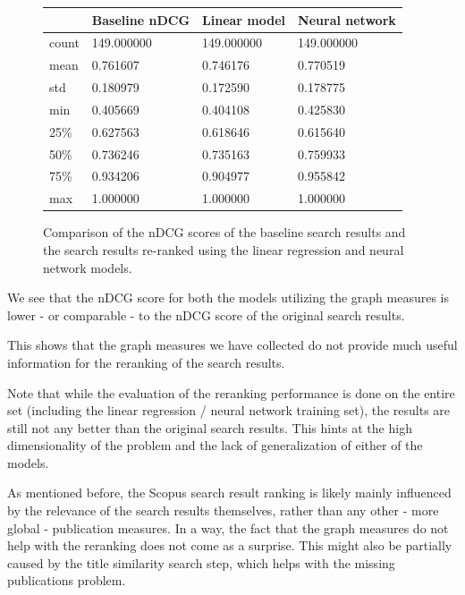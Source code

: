 \begin{figure}[!ht]
    \centering
    \begin{tabular}{|l|l|l|l|}
    \hline
        ~ & \textbf{Baseline nDCG} & \textbf{Linear model} & \textbf{Neural network} \\ \hline
        count & 149.000000 & 149.000000 & 149.000000 \\ \hline
        mean & 0.761607 & 0.746176 & 0.770519 \\ \hline
        std & 0.180979 & 0.172590 & 0.178775 \\ \hline
        min & 0.405669 & 0.404108 & 0.425830 \\ \hline
        25\% & 0.627563 & 0.618646 & 0.615640 \\ \hline
        50\% & 0.736246 & 0.735163 & 0.759933 \\ \hline
        75\% & 0.934206 & 0.904977 & 0.955842 \\ \hline
        max & 1.000000 & 1.000000 & 1.000000 \\ \hline
    \end{tabular}
    \captionsetup{width=.9\linewidth}
    \caption{Comparison of the nDCG scores of the baseline search results and the search results re-ranked using the linear regression and neural network models.}
\end{figure}

We see that the nDCG score for both the models utilizing the graph measures is lower - or comparable - 
to the nDCG score of the original search results.

This shows that the graph measures we have collected do not provide much useful information 
for the reranking of the search results. 

Note that while the evaluation of the reranking performance is done on the entire set 
(including the linear regression / neural network training set), 
the results are still not any better than the original search results. 
This hints at the high dimensionality of the problem and the lack of generalization of either of the models.

As mentioned before, the Scopus search result ranking is likely mainly influenced by the relevance of 
the search results themselves, rather than any other - more global - publication measures. 
In a way, the fact that the graph measures do not help with the reranking does not come as a surprise. 
This might also be partially caused by the title similarity search step, which helps with the missing publications problem.

